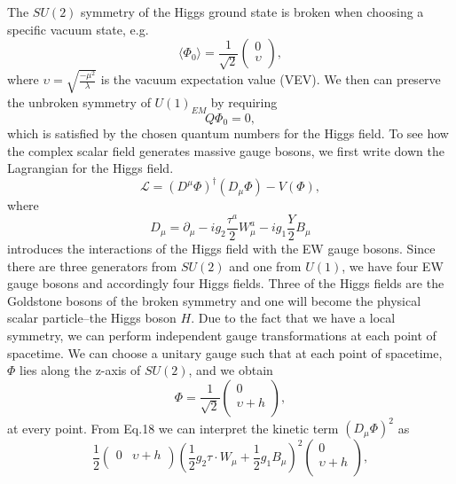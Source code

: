 \documentclass[secnumarabic, graphics,floatfix,nofootinbib,amsmath
tightenlines,nobibnotes,aps,prl,12pt]{revtex4-1}
\begin{document}
The $SU(2)$ symmetry of the Higgs ground state is broken when choosing a specific vacuum state, e.g.
\begin{equation}
\langle \Phi_0 \rangle=\frac{1}{\sqrt{2}}\left(
\begin{array}{c}
 0 \\
\upsilon \\
\end{array}
\right),
\end{equation}
where $\upsilon=\sqrt{\frac{-\mu^2}{\lambda}}$ is the vacuum expectation value (VEV). We then can preserve the unbroken symmetry of $U(1)_{EM}$ by requiring
\begin{equation}
Q\Phi_0 =0,
\end{equation}
which is satisfied by the chosen quantum numbers for the Higgs field.
To see how the complex scalar field generates massive gauge bosons, we first write down the Lagrangian for the Higgs field.
\begin{equation}
\mathcal{L}=(D^{\mu}\Phi)^\dagger(D_{\mu}\Phi)-V(\Phi),
\end{equation}
where
\begin{equation}
D_{\mu}=\partial_{\mu}-ig_2\frac{\tau^a}{2}W^a_{\mu}-ig_1\frac{Y}{2}B_{\mu}
\end{equation}
introduces the interactions of the Higgs field with the EW gauge bosons. Since there are three generators from $SU(2)$ and one from $U(1)$, we have four EW gauge bosons and accordingly four Higgs fields. Three of the Higgs fields are the Goldstone bosons of the broken symmetry and one will become the physical scalar particle--the Higgs boson $H$. Due to the fact that we have a local symmetry, we can perform independent gauge transformations at each point of spacetime. We can choose a unitary gauge such that at each point of spacetime, $\Phi$ lies along the z-axis of $SU(2)$, and we obtain
\begin{equation}
\Phi=\frac{1}{\sqrt{2}}\left(
\begin{array}{c}
 0 \\
\upsilon+h \\
\end{array}
\right),
\end{equation}
at every point. From Eq.18 we can interpret the kinetic term $(D_{\mu}\Phi)^2$ as 
\begin{equation}
\frac{1}{2}\left(
\begin{array}{cc}
 0 & \upsilon+h \\
\end{array}
\right)(\frac{1}{2}g_2\tau \cdot W_{\mu}+\frac{1}{2}g_1B_{\mu})^2\left(
\begin{array}{c}
 0 \\
\upsilon+h \\
\end{array}
\right),
\end{equation}
\end{document}
